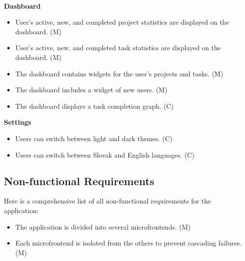 \  \\
\textbf{Dashboard}
\begin{itemize}
   \item User's active, new, and completed project statistics are displayed on the dashboard. (M)
   \item User's active, new, and completed task statistics are displayed on the dashboard. (M)
   \item The dashboard contains widgets for the user's projects and tasks. (M)
   \item The dashboard includes a widget of new users. (M)
   \item The dashboard displays a task completion graph. (C)
\end{itemize}
\textbf{Settings}
\begin{itemize}
   \item Users can switch between light and dark themes. (C)
   \item Users can switch between Slovak and English languages. (C)
\end{itemize}

\subsection{Non-functional Requirements}
Here is a comprehensive list of all non-functional requirements for the application:
\begin{itemize}
   \item The application is divided into several microfrontends. (M)
   \item Each microfrontend is isolated from the others to prevent cascading failures. (M)
\end{itemize}